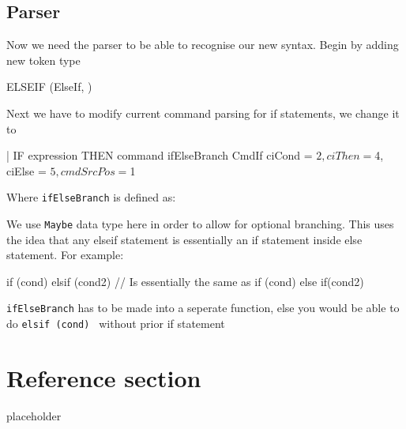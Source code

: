\documentclass{article}
\begin{document}
\subsection{Parser}
\begin{flushleft}
Now we need the parser to be able to recognise our new syntax. Begin by adding new token type
\end{flushleft}
\begin{code}
ELSEIF      { (ElseIf, $$) }
\end{code}
\begin{flushleft}
Next we have to modify current command parsing for if statements, we change it to
\end{flushleft}
\begin{code}
| IF expression THEN command ifElseBranch
  { CmdIf {ciCond = $2, ciThen = $4, ciElse = $5, cmdSrcPos = $1} }
\end{code}
\begin{flushleft}
Where \texttt{ifElseBranch} is defined as:
\end{flushleft}
\begin{flushleft}
We use \texttt{Maybe} data type here in order to allow for optional branching. This uses the idea that any elseif statement is essentially an if statement inside else statement. For example:
\end{flushleft}
\begin{code}
if (cond) {} elsif (cond2) {}
// Is essentially the same as
if (cond) {} else { if(cond2) {} }
\end{code}
\begin{flushleft}
\texttt{ifElseBranch} has to be made into a seperate function, else you would be able to do \texttt{elsif (cond) {}} without prior if statement
\end{flushleft}

\pagebreak
\section*{Reference section} \label{sec:reference}
\begin{description}
	\item[placeholder] \hfill \\
\end{description}
\end{document}
